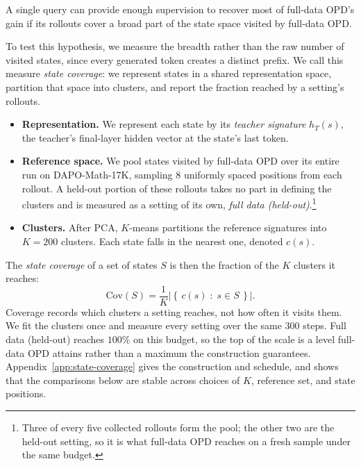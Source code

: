\begin{tcolorbox}[examplebox, title={Hypothesis}]
\small
A single query can provide enough supervision to recover most of full-data OPD's gain if its rollouts cover a broad part of the state space visited by full-data OPD.
\end{tcolorbox}

To test this hypothesis, we measure the breadth rather than the raw number of visited states, since every generated token creates a distinct prefix. We call this measure \emph{state coverage}: we represent states in a shared representation space, partition that space into clusters, and report the fraction reached by a setting's rollouts.
\begin{itemize}[topsep=1pt, partopsep=0pt, leftmargin=13pt, itemsep=2pt, parsep=0pt]
    \item \textbf{Representation.} We represent each state by its \emph{teacher signature} \(h_T(s)\), the teacher's final-layer hidden vector at the state's last token.
    \item \textbf{Reference space.} We pool states visited by full-data OPD over its entire run on DAPO-Math-17K, sampling \(8\) uniformly spaced positions from each rollout. A held-out portion of these rollouts takes no part in defining the clusters and is measured as a setting of its own, \emph{full data (held-out)}.\footnote{Three of every five collected rollouts form the pool; the other two are the held-out setting, so it is what full-data OPD reaches on a fresh sample under the same budget.}
    \item \textbf{Clusters.} After PCA, \(K\)-means partitions the reference signatures into \(K=200\) clusters. Each state falls in the nearest one, denoted \(c(s)\).
\end{itemize}
The \emph{state coverage} of a set of states \(S\) is then the fraction of the \(K\) clusters it reaches:
\begin{equation}
    \mathrm{Cov}(S)
    =
    \frac{1}{K}
    \left|
    \left\{\,c(s)\;:\;s\in S\,\right\}
    \right|.
    \label{eq:state-coverage}
\end{equation}
Coverage records which clusters a setting reaches, not how often it visits them. We fit the clusters once and measure every setting over the same \(300\) steps. Full data (held-out) reaches \(100\%\) on this budget, so the top of the scale is a level full-data OPD attains rather than a maximum the construction guarantees. Appendix~\ref{app:state-coverage} gives the construction and schedule, and shows that the comparisons below are stable across choices of \(K\), reference set, and state positions.

